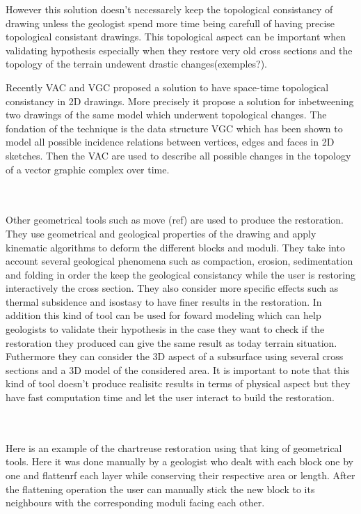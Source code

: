 \documentclass[12pt, a4paper]{memoir} %
\begin{document}
However this solution doesn't necessarely keep the topological consistancy of drawing unless the geologist spend more time being carefull of having precise topological consistant drawings. This topological aspect can be important when validating hypothesis especially when they restore very old cross sections and the topology of the terrain undewent drastic changes(exemples?).

Recently VAC and VGC proposed a solution to have space-time topological consistancy in 2D drawings. More precisely it propose a solution for inbetweening two drawings of the same model which underwent topological changes. The fondation of the technique is the data structure VGC which has been shown to model all possible incidence relations between vertices, edges and faces in 2D sketches. Then the VAC are used to describe all possible changes in the topology of a vector graphic complex over time.\\\\\

Other geometrical tools such as move (ref) are used  to produce the restoration. They use geometrical and geological properties of the drawing and apply kinematic algorithms to deform the different blocks and moduli. They take into account several geological phenomena such as compaction, erosion, sedimentation and folding in order the keep the geological consistancy while the user is restoring interactively the cross section. They also consider more specific effects such as thermal subsidence and isostasy to have finer results in the restoration. In addition this kind of tool can be used for foward modeling which can help geologists to validate their hypothesis in the case they want to check if the restoration they produced can give the same result as today terrain situation. Futhermore they can consider the 3D aspect of a subsurface using several cross sections and a 3D model of the considered area. It is important to note that this kind of tool doesn't produce realisitc results in terms of physical aspect but they have fast computation time and let the user interact to build the restoration.\\\\\

Here is an example of the chartreuse restoration using that king of geometrical tools. Here it was done manually by a geologist who  dealt with each block one by one and flattenrf each layer while conserving their respective area or length. After the flattening operation the user can manually stick the new block to its neighbours with the corresponding moduli facing each other.
\end{document}
